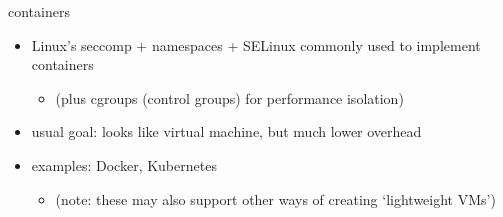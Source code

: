 \begin{frame}{containers}
    \begin{itemize}
    \item Linux's seccomp + namespaces + SELinux commonly used to implement containers
        \begin{itemize}
        \item (plus cgroups (control groups) for performance isolation)
        \end{itemize}
    \vspace{.5cm}
    \item usual goal: looks like virtual machine, but much lower overhead
    \item examples: Docker, Kubernetes
        \begin{itemize}
        \item (note: these may also support other ways of creating `lightweight VMs')
        \end{itemize}
    \end{itemize}
\end{frame}


